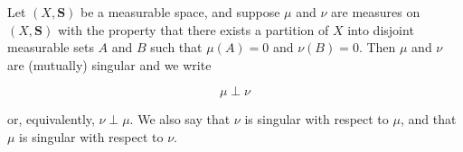 Let $(X, \mathbf{S})$ be a measurable space, and suppose $\mu$ and $\nu$ are measures on $(X, \mathbf{S})$ with the property that there exists a partition of $X$ into disjoint measurable sets $A$ and $B$ such that $\mu(A) = 0$ and $\nu(B) = 0$. Then $\mu$ and $\nu$ are (mutually) singular and we write

$$\mu \perp \nu$$

or, equivalently, $\nu \perp \mu$. We also say that $\nu$ is singular with respect to $\mu$, and that $\mu$ is singular with respect to $\nu$.
